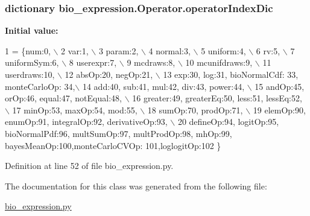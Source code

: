 \subsubsection[{\texorpdfstring{operator\+Index\+Dic}{operatorIndexDic}}]{\setlength{\rightskip}{0pt plus 5cm}dictionary bio\+\_\+expression.\+Operator.\+operator\+Index\+Dic\hspace{0.3cm}{\ttfamily [static]}}\hypertarget{classbio__expression_1_1_operator_a7a73e3af3a9dcc697b1450e442f3bec5}{}\label{classbio__expression_1_1_operator_a7a73e3af3a9dcc697b1450e442f3bec5}
{\bfseries Initial value\+:}
\begin{DoxyCode}
1 = \{num:0, \(\backslash\)
2                     var:1, \(\backslash\)
3                     param:2, \(\backslash\)
4                     normal:3, \(\backslash\)
5                     uniform:4, \(\backslash\)
6                     rv:5, \(\backslash\)
7                     uniformSym:6, \(\backslash\)
8                     userexpr:7, \(\backslash\)
9                     mcdraws:8, \(\backslash\)
10                     mcunifdraws:9, \(\backslash\)
11                     userdraws:10, \(\backslash\)
12                     absOp:20, negOp:21, \(\backslash\)
13                     exp:30, log:31, bioNormalCdf: 33, monteCarloOp: 34,\(\backslash\)
14                     add:40, sub:41, mul:42, div:43, power:44, \(\backslash\)
15                     andOp:45, orOp:46, equal:47, notEqual:48, \(\backslash\)
16                     greater:49, greaterEq:50, less:51, lessEq:52, \(\backslash\)
17                     minOp:53, maxOp:54, mod:55, \(\backslash\)
18                     sumOp:70, prodOp:71,  \(\backslash\)
19                     elemOp:90, enumOp:91,  integralOp:92, derivativeOp:93, \(\backslash\)
20                     defineOp:94, logitOp:95, bioNormalPdf:96, multSumOp:97, multProdOp:98, mhOp:99, 
      bayesMeanOp:100,monteCarloCVOp: 101,loglogitOp:102     \}
\end{DoxyCode}


Definition at line 52 of file bio\+\_\+expression.\+py.



The documentation for this class was generated from the following file\+:\begin{DoxyCompactItemize}
\item 
\hyperlink{bio__expression_8py}{bio\+\_\+expression.\+py}\end{DoxyCompactItemize}
